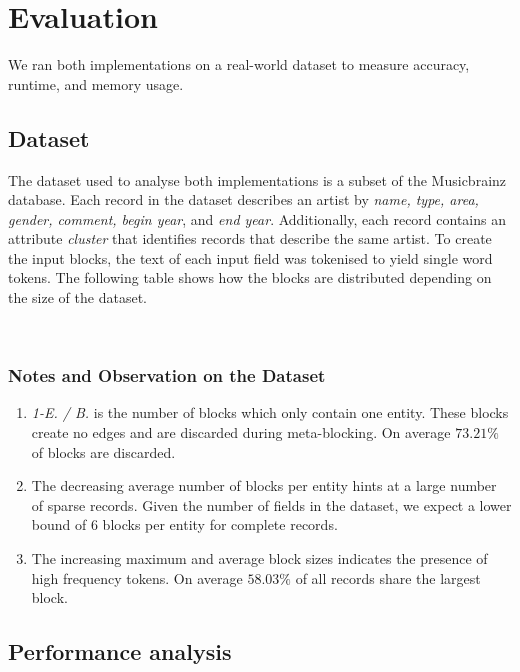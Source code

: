 \documentclass[a4paper,12pt]{article}
\begin{document}
\newpage
\section{Evaluation}
We ran both implementations on a real-world dataset to measure accuracy, runtime, and memory usage.

\subsection{Dataset}
The dataset used to analyse both implementations is a subset of the Musicbrainz database. Each record in the dataset describes an artist by \emph{name, type, area, gender, comment, begin year}, and \emph{end year}. Additionally, each record contains an attribute \emph{cluster} that identifies records that describe the same artist. To create the input blocks, the text of each input field was tokenised to yield single word tokens. The following table shows how the blocks are distributed depending on the size of the dataset.

\begin{center}
\scalebox{0.90}{} \\
\end{center}

\subsubsection{Notes and Observation on the Dataset}
\begin{enumerate}
  \item \emph{1-E. / B.} is the number of blocks which only contain one entity. These blocks create no edges and are discarded during meta-blocking. On average $73.21\%$ of blocks are discarded.
  \item The decreasing average number of blocks per entity hints at a large number of sparse records. Given the number of fields in the dataset, we expect a lower bound of $6$ blocks per entity for complete records.
  \item The increasing maximum and average block sizes indicates the presence of high frequency tokens. On average $58.03\%$ of all records share the largest block. 
\end{enumerate}

\newpage
\subsection{Performance analysis}
\end{document}
